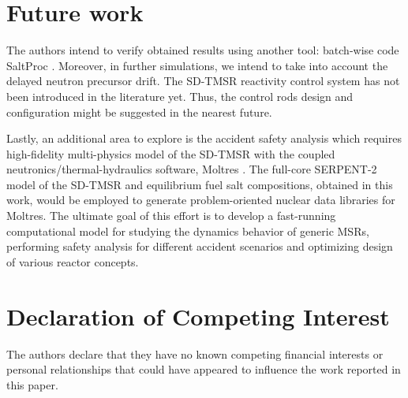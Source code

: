 \section{Future work}
The authors intend to verify obtained results using another tool: batch-wise 
code SaltProc \cite{rykhlevskii_arfc/saltproc_2018,rykhlevskii_milestone_2019}.
Moreover, in further simulations, we intend to take into account the delayed 
neutron precursor drift. The \gls{SD-TMSR} reactivity control system has not 
been introduced in the literature yet. Thus, the control rods design and 
configuration might be suggested in the nearest future.

Lastly, an additional area to explore is the accident safety analysis which 
requires high-fidelity multi-physics model of the \gls{SD-TMSR} with the 
coupled neutronics/thermal-hydraulics software, Moltres 
\cite{lindsay_introduction_2018}. The full-core SERPENT-2 model of the 
\gls{SD-TMSR} and equilibrium fuel salt compositions, obtained in this work, 
would be employed to generate problem-oriented nuclear data libraries for 
Moltres. The ultimate goal of this effort is to develop a 
fast-running computational model for studying the dynamics behavior of generic 
\glspl{MSR}, performing safety analysis for different accident scenarios and 
optimizing design of various reactor concepts.

\section{Declaration of Competing Interest}

The authors declare that they have no known competing financial interests or personal relationships that could have appeared to influence the work reported in this paper.
